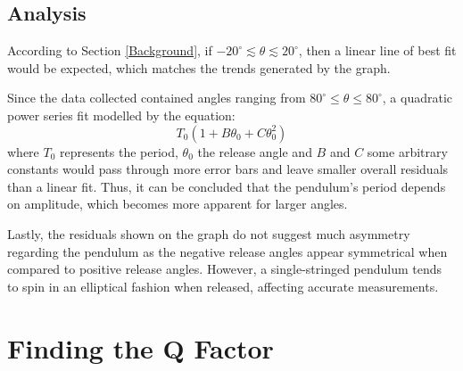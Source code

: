 \documentclass[12pt]{article}
\begin{document}
\subsection{Analysis}
According to Section \ref{Background}, if $-20^{\circ} \lesssim \theta \lesssim 20^{\circ}$, then a linear line of best fit would be expected, which matches the trends generated by the graph.

Since the data collected contained angles ranging from $ 80^{\circ} \leq \theta \leq 80^{\circ}$, a quadratic power series fit modelled by the equation:
\begin{equation}
    T_0(1 + B\theta_0 + C\theta_0^2)
\end{equation}
where $T_0$ represents the period, $\theta_0$ the release angle and $B$ and $C$ some arbitrary constants would pass through more error bars and leave smaller overall residuals than a linear fit. Thus, it can be concluded that the pendulum's period depends on amplitude, which becomes more apparent for larger angles.

Lastly, the residuals shown on the graph do not suggest much asymmetry regarding the pendulum as the negative release angles appear symmetrical when compared to positive release angles. However, a single-stringed pendulum tends to spin in an elliptical fashion when released, affecting accurate measurements.

\section{Finding the Q Factor}
\end{document}
